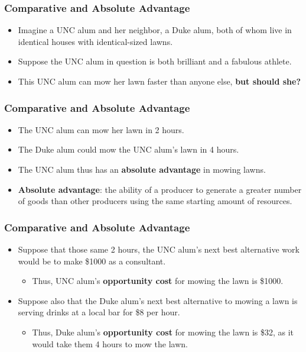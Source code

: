 \documentclass{beamer}
\begin{document}
\begin{frame} 
	\frametitle{\LARGE{Comparative and Absolute Advantage}}
	\begin{itemize}
		\item Imagine a UNC alum and her neighbor, a Duke alum, both of whom live in identical houses with identical-sized lawns. \pause
		\item Suppose the UNC alum in question is both brilliant and a fabulous athlete.  \pause
		\item This UNC alum can mow her lawn faster than anyone else, \textbf{but should she?}  
	\end{itemize}
\end{frame}

\begin{frame} 
	\frametitle{\LARGE{Comparative and Absolute Advantage}}
	\begin{itemize}
		\item The UNC alum can mow her lawn in 2 hours. \pause
		\item The Duke alum could mow the UNC alum’s lawn in 4 hours. \pause
		\item The UNC alum thus has an \textbf{absolute advantage} in mowing lawns. \pause
		\item \textbf{Absolute advantage}: the ability of a producer to generate a greater number of goods than other producers using the same starting amount of resources.
	\end{itemize}
\end{frame}

\begin{frame} 
	\frametitle{\LARGE{Comparative and Absolute Advantage}}
	\begin{itemize}
		\item Suppose that those same 2 hours, the UNC alum's next best alternative work would be to make \$1000 as a consultant. \pause
		\begin{itemize}
			\item Thus, UNC alum's \textbf{opportunity cost} for mowing the lawn is \$1000. \pause 
		\end{itemize}
		\item Suppose also that the Duke alum’s next best alternative to mowing a lawn is serving drinks at a local bar for \$8 per hour.  \pause
		\begin{itemize}
			\item Thus, Duke alum's \textbf{opportunity cost} for mowing the lawn is \$32, as it would take them 4 hours to mow the lawn.
		\end{itemize}
	\end{itemize}
\end{frame}
\end{document}
